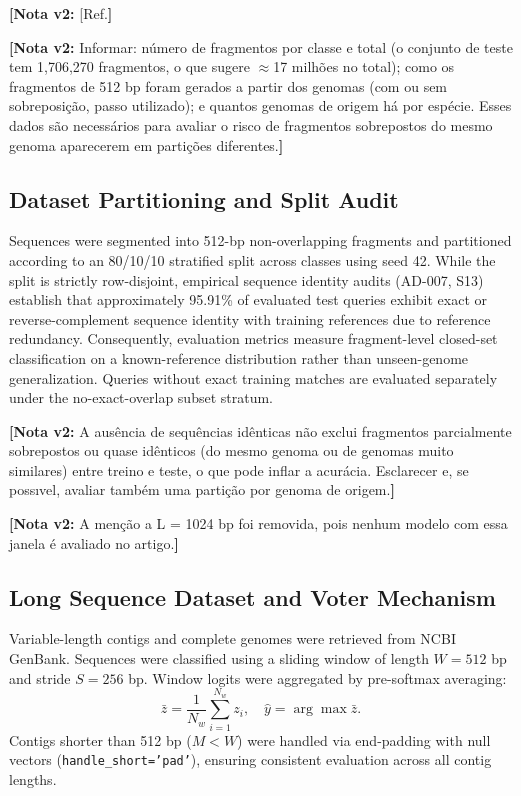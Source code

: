 \documentclass[11pt,a4paper]{article}
\newcommand{\notavdois}[1]{\par\vspace{0.4em}\noindent\colorbox{yellow!25}{\begin{minipage}{0.96\linewidth}\footnotesize\textbf{[Nota v2:} #1\textbf{]}\end{minipage}}\par\vspace{0.4em}}
\begin{document}
\notavdois{[Ref.}


\notavdois{Informar: número de fragmentos por classe e total (o conjunto de teste tem 1,706,270 fragmentos, o que sugere $\approx$17 milhões no total); como os fragmentos de 512 bp foram gerados a partir dos genomas (com ou sem sobreposição, passo utilizado); e quantos genomas de origem há por espécie. Esses dados são necessários para avaliar o risco de fragmentos sobrepostos do mesmo genoma aparecerem em partições diferentes.}


\subsection{Dataset Partitioning and Split Audit}
Sequences were segmented into 512-bp non-overlapping fragments and partitioned according to an 80/10/10 stratified split across classes using seed 42. While the split is strictly row-disjoint, empirical sequence identity audits (AD-007, S13) establish that approximately 95.91\% of evaluated test queries exhibit exact or reverse-complement sequence identity with training references due to reference redundancy. Consequently, evaluation metrics measure fragment-level closed-set classification on a known-reference distribution rather than unseen-genome generalization. Queries without exact training matches are evaluated separately under the no-exact-overlap subset stratum.

\notavdois{A ausência de sequências idênticas não exclui fragmentos parcialmente sobrepostos ou quase idênticos (do mesmo genoma ou de genomas muito similares) entre treino e teste, o que pode inflar a acurácia. Esclarecer e, se possıvel, avaliar também uma partição por genoma de origem.}


\notavdois{A menção a L = 1024 bp foi removida, pois nenhum modelo com essa janela é avaliado no artigo.}


\subsection{Long Sequence Dataset and Voter Mechanism}
Variable-length contigs and complete genomes were retrieved from NCBI GenBank. Sequences were classified using a sliding window of length $W = 512$ bp and stride $S = 256$ bp. Window logits were aggregated by pre-softmax averaging:
\begin{equation}
\bar{z} = \frac{1}{N_w} \sum_{i=1}^{N_w} z_i, \quad \hat{y} = \arg\max \bar{z}.
\end{equation}
Contigs shorter than 512 bp ($M < W$) were handled via end-padding with null vectors (\texttt{handle\_short='pad'}), ensuring consistent evaluation across all contig lengths.
\end{document}
